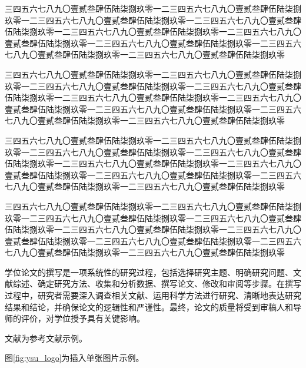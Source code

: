 \documentclass[master,academic]{ysuthesis} %
\begin{document}
		三四五六七八九〇壹贰叁肆伍陆柒捌玖零一二三四五六七八九〇壹贰叁肆伍陆柒捌玖零一二三四五六七八九〇壹贰叁肆伍陆柒捌玖零一二三四五六七八九〇壹贰叁肆伍陆柒捌玖零一二三四五六七八九〇壹贰叁肆伍陆柒捌玖零一二三四五六七八九〇壹贰叁肆伍陆柒捌玖零一二三四五六七八九〇壹贰叁肆伍陆柒捌玖零一二三四五六七八九〇壹贰叁肆伍陆柒捌玖零一二三四五六七八九〇壹贰叁肆伍陆柒捌玖零

		三四五六七八九〇壹贰叁肆伍陆柒捌玖零一二三四五六七八九〇壹贰叁肆伍陆柒捌玖零一二三四五六七八九〇壹贰叁肆伍陆柒捌玖零一二三四五六七八九〇壹贰叁肆伍陆柒捌玖零一二三四五六七八九〇壹贰叁肆伍陆柒捌玖零一二三四五六七八九〇壹贰叁肆伍陆柒捌玖零一二三四五六七八九〇壹贰叁肆伍陆柒捌玖零一二三四五六七八九〇壹贰叁肆伍陆柒捌玖零一二三四五六七八九〇壹贰叁肆伍陆柒捌玖零

		三四五六七八九〇壹贰叁肆伍陆柒捌玖零一二三四五六七八九〇壹贰叁肆伍陆柒捌玖零一二三四五六七八九〇壹贰叁肆伍陆柒捌玖零一二三四五六七八九〇壹贰叁肆伍陆柒捌玖零一二三四五六七八九〇壹贰叁肆伍陆柒捌玖零一二三四五六七八九〇壹贰叁肆伍陆柒捌玖零一二三四五六七八九〇壹贰叁肆伍陆柒捌玖零一二三四五六七八九〇壹贰叁肆伍陆柒捌玖零一二三四五六七八九〇壹贰叁肆伍陆柒捌玖零

		三四五六七八九〇壹贰叁肆伍陆柒捌玖零一二三四五六七八九〇壹贰叁肆伍陆柒捌玖零一二三四五六七八九〇壹贰叁肆伍陆柒捌玖零一二三四五六七八九〇壹贰叁肆伍陆柒捌玖零一二三四五六七八九〇壹贰叁肆伍陆柒捌玖零一二三四五六七八九〇壹贰叁肆伍陆柒捌玖零一二三四五六七八九〇壹贰叁肆伍陆柒捌玖零一二三四五六七八九〇壹贰叁肆伍陆柒捌玖零一二三四五六七八九〇壹贰叁肆伍陆柒捌玖零

		学位论文的撰写是一项系统性的研究过程，包括选择研究主题、明确研究问题、文献综述、确定研究方法、收集和分析数据、撰写论文、修改和审阅等步骤。在撰写过程中，研究者需要深入调查相关文献、运用科学方法进行研究、清晰地表达研究结果和结论，并确保论文的逻辑性和严谨性。最终，论文的质量将受到审稿人和导师的评价，对学位授予具有关键影响。

		文献\cite{texbook,latex:companion,latex2e,knuth:1984,lesk:1977}为参考文献示例。

		图\ref{fig:ysu_logo}为插入单张图片示例。
\end{document}
